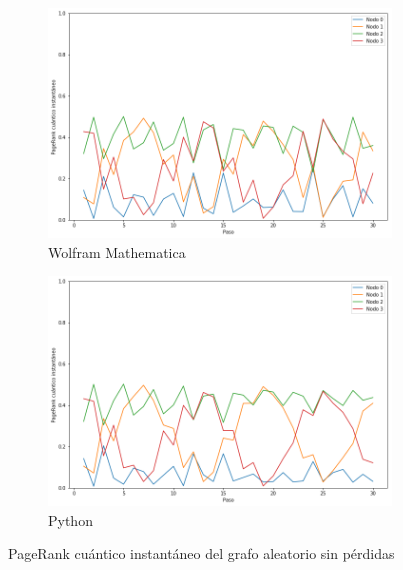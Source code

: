\begin{figure}[H]
    \centering
    \begin{subfigure}[m]{0.45\textwidth}
        \centering
        \includegraphics[width=0.9\linewidth]{img/any-inst-M.png}
        \caption{Wolfram Mathematica}
    \end{subfigure}
    \begin{subfigure}[m]{0.45\textwidth}
        \centering
        \includegraphics[width=0.9\linewidth]{img/any-inst-lossless.png}
        \caption{Python}
    \end{subfigure}
    \caption[PageRank cuántico instantáneo del grafo aleatorio sin pérdidas]{PageRank cuántico instantáneo del grafo aleatorio sin pérdidas}
    \label{fig:instanylossless}
\end{figure}

